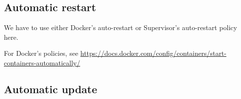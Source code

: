 \subsection{Automatic restart}


We have to use either Docker's auto-restart or Supervisor's auto-restart policy here.

For Docker's policies, see \url{https://docs.docker.com/config/containers/start-containers-automatically/}


\subsection{Automatic update}

